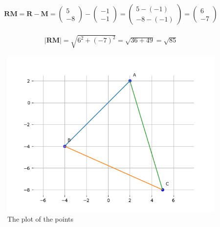 \documentclass[journal]{IEEEtran}
\numberwithin{equation}{enumi}
\numberwithin{figure}{enumi}
\begin{document}
\begin{align}
\mathbf{RM} = \mathbf{R} - \mathbf{M} = \begin{pmatrix} 5 \\ -8 \end{pmatrix} - \begin{pmatrix} -1 \\ -1 \end{pmatrix} = \begin{pmatrix} 5 - (-1) \\ -8 - (-1) \end{pmatrix} = \begin{pmatrix} 6 \\ -7 \end{pmatrix}
\end{align}




\begin{align}
|\mathbf{RM}| = \sqrt{6^2 + (-7)^2} = \sqrt{36 + 49} = \sqrt{85}
\end{align}



\begin{figure}[h!]
  \hspace{-1cm}
  \includegraphics[width=1.2\textwidth]{Figure_2.png}
  
  \caption{The plot of the points }
  \label{fig:your_label}
\end{figure}
\end{document}

